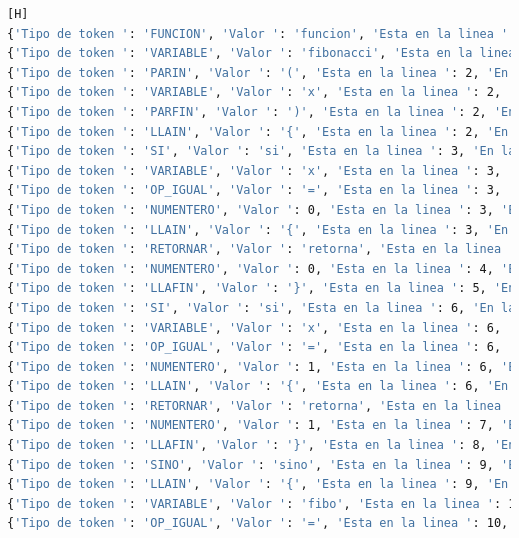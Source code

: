 \documentclass{article}
\begin{document}

\begin{lstlisting}[language=bash,caption={Tokens de Fibonacci}][H]
{'Tipo de token ': 'FUNCION', 'Valor ': 'funcion', 'Esta en la linea ': 2, 'En la posición ': 18}
{'Tipo de token ': 'VARIABLE', 'Valor ': 'fibonacci', 'Esta en la linea ': 2, 'En la posición ': 26}
{'Tipo de token ': 'PARIN', 'Valor ': '(', 'Esta en la linea ': 2, 'En la posición ': 35}
{'Tipo de token ': 'VARIABLE', 'Valor ': 'x', 'Esta en la linea ': 2, 'En la posición ': 36}
{'Tipo de token ': 'PARFIN', 'Valor ': ')', 'Esta en la linea ': 2, 'En la posición ': 37}
{'Tipo de token ': 'LLAIN', 'Valor ': '{', 'Esta en la linea ': 2, 'En la posición ': 38}
{'Tipo de token ': 'SI', 'Valor ': 'si', 'Esta en la linea ': 3, 'En la posición ': 44}
{'Tipo de token ': 'VARIABLE', 'Valor ': 'x', 'Esta en la linea ': 3, 'En la posición ': 47}
{'Tipo de token ': 'OP_IGUAL', 'Valor ': '=', 'Esta en la linea ': 3, 'En la posición ': 49}
{'Tipo de token ': 'NUMENTERO', 'Valor ': 0, 'Esta en la linea ': 3, 'En la posición ': 51}
{'Tipo de token ': 'LLAIN', 'Valor ': '{', 'Esta en la linea ': 3, 'En la posición ': 52}
{'Tipo de token ': 'RETORNAR', 'Valor ': 'retorna', 'Esta en la linea ': 4, 'En la posición ': 62}
{'Tipo de token ': 'NUMENTERO', 'Valor ': 0, 'Esta en la linea ': 4, 'En la posición ': 70}
{'Tipo de token ': 'LLAFIN', 'Valor ': '}', 'Esta en la linea ': 5, 'En la posición ': 76}
{'Tipo de token ': 'SI', 'Valor ': 'si', 'Esta en la linea ': 6, 'En la posición ': 82}
{'Tipo de token ': 'VARIABLE', 'Valor ': 'x', 'Esta en la linea ': 6, 'En la posición ': 85}
{'Tipo de token ': 'OP_IGUAL', 'Valor ': '=', 'Esta en la linea ': 6, 'En la posición ': 87}
{'Tipo de token ': 'NUMENTERO', 'Valor ': 1, 'Esta en la linea ': 6, 'En la posición ': 89}
{'Tipo de token ': 'LLAIN', 'Valor ': '{', 'Esta en la linea ': 6, 'En la posición ': 90}
{'Tipo de token ': 'RETORNAR', 'Valor ': 'retorna', 'Esta en la linea ': 7, 'En la posición ': 100}
{'Tipo de token ': 'NUMENTERO', 'Valor ': 1, 'Esta en la linea ': 7, 'En la posición ': 108}
{'Tipo de token ': 'LLAFIN', 'Valor ': '}', 'Esta en la linea ': 8, 'En la posición ': 114}
{'Tipo de token ': 'SINO', 'Valor ': 'sino', 'Esta en la linea ': 9, 'En la posición ': 120}
{'Tipo de token ': 'LLAIN', 'Valor ': '{', 'Esta en la linea ': 9, 'En la posición ': 125}
{'Tipo de token ': 'VARIABLE', 'Valor ': 'fibo', 'Esta en la linea ': 10, 'En la posición ': 135}
{'Tipo de token ': 'OP_IGUAL', 'Valor ': '=', 'Esta en la linea ': 10, 'En la posición ': 140}

\end{lstlisting}
\end{document}
